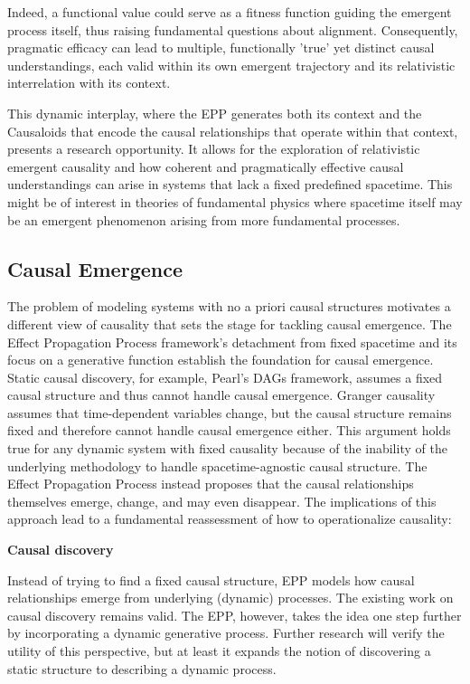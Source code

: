 Indeed, a functional value could serve as a fitness function guiding the emergent process itself, thus raising fundamental questions about alignment. Consequently, pragmatic efficacy can lead to multiple, functionally 'true' yet distinct causal understandings, each valid within its own emergent trajectory and its relativistic interrelation with its context.

This dynamic interplay, where the EPP generates both its context and the Causaloids that encode the causal relationships that operate within that context, presents a research opportunity. It allows for the exploration of relativistic emergent causality and how coherent and pragmatically effective causal understandings can arise in systems that lack a fixed predefined spacetime. This might be of interest in theories of fundamental physics where spacetime itself may be an emergent phenomenon arising from more fundamental processes.

\subsection{Causal Emergence}

\label{sec:causal_emergence}

The problem of modeling systems with no a priori causal structures motivates a different view of causality that sets the stage for tackling  causal emergence. The Effect Propagation Process framework's detachment from fixed spacetime and its focus on a generative function establish the foundation for causal emergence. Static causal discovery, for example, Pearl’s DAGs framework, assumes a fixed causal structure and thus cannot handle causal emergence. Granger causality assumes that time-dependent variables change, but the causal structure remains fixed and therefore cannot handle causal emergence either. This argument holds true for any dynamic system with fixed causality because of the inability of the underlying methodology to handle spacetime-agnostic causal structure. The Effect Propagation Process instead proposes that the causal relationships themselves emerge, change, and may even disappear. The implications of this approach lead to a fundamental reassessment of how to operationalize causality:

\textbf{Causal discovery}

Instead of trying to find a fixed causal structure, EPP models how causal relationships emerge from underlying (dynamic) processes. The existing work on causal discovery remains valid. The EPP, however, takes the idea one step further by incorporating a dynamic generative process. Further research will verify the utility of this perspective, but at least it expands the notion of discovering a static structure to describing a dynamic process.

